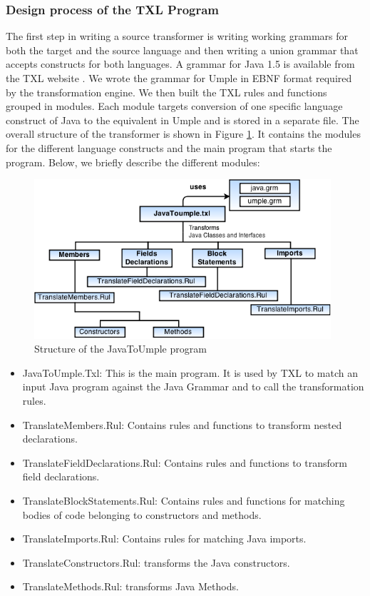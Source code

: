 \subsubsection{Design process of the TXL Program}

The first step in writing a source transformer is writing working grammars for both the target and the source language and then writing a union grammar that accepts constructs for both languages. A grammar for Java 1.5 is available from the TXL website \cite{txlresources}. We wrote the grammar for Umple in EBNF format required by the transformation engine. We then built the TXL rules and functions grouped in modules. Each module targets conversion of one specific language construct of Java to the equivalent in Umple and is stored in a separate file. The overall structure of the transformer is shown in Figure \ref{fig:txlStructure}. It contains the modules for the different language constructs and the main program that starts the program. Below, we briefly describe the different modules:

\begin{figure}[h]
\centering
\includegraphics[width=0.98\textwidth]{Figures/TXL_STRUCTURE.png} 
\caption{Structure of the JavaToUmple program}
\label{fig:txlStructure}
\end{figure}

\begin{itemize}
\item JavaToUmple.Txl: This is the main program. It is used by TXL to match an input Java program against the Java Grammar and to call the transformation rules.
\item TranslateMembers.Rul: Contains rules and functions to transform nested declarations.
\item TranslateFieldDeclarations.Rul: Contains rules and functions to transform field declarations.
\item  TranslateBlockStatements.Rul: Contains rules and functions for matching bodies of code belonging to constructors and methods.
\item TranslateImports.Rul: Contains rules for matching Java imports.
\item TranslateConstructors.Rul: transforms the Java constructors.
\item TranslateMethods.Rul: transforms Java Methods.
\end{itemize}

